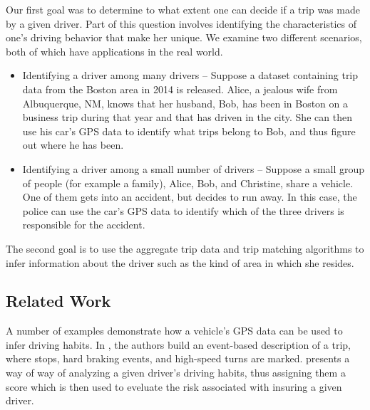 \documentclass{article}
\begin{document}
Our first goal was to determine to what extent one can decide if a trip was made by a given driver. Part of this question involves identifying the characteristics of one's driving behavior that make her unique. We examine two different scenarios, both of which have applications in the real world.
\begin{itemize}
\item Identifying a driver among many drivers -- Suppose a dataset containing trip data from the Boston area in 2014 is released. Alice, a jealous wife from Albuquerque, NM, knows that her husband, Bob, has been in Boston on a business trip during that year and that has driven in the city. She can then use his car's GPS data to identify what trips belong to Bob, and thus figure out where he has been.

\item Identifying a driver among a small number of drivers -- Suppose a small group of people (for example a family), Alice, Bob, and Christine, share a vehicle. One of them gets into an accident, but decides to run away. In this case, the police can use the car's GPS data to identify which of the three drivers is responsible for the accident. 
\end{itemize}

The second goal is to use the aggregate trip data and trip matching algorithms to infer information about the driver such as the kind of area in which she resides. 

\subsection{Related Work}

A number of examples demonstrate how a vehicle's GPS data can be used to infer driving habits. In \cite{roadmap}, the authors build an event-based description of a trip, where stops, hard braking events, and high-speed turns are marked. \cite{mydrive2012} presents a way of way of analyzing a given driver's driving habits, thus assigning them a score which is then used to eveluate the risk associated with insuring a given driver. %
\end{document}
